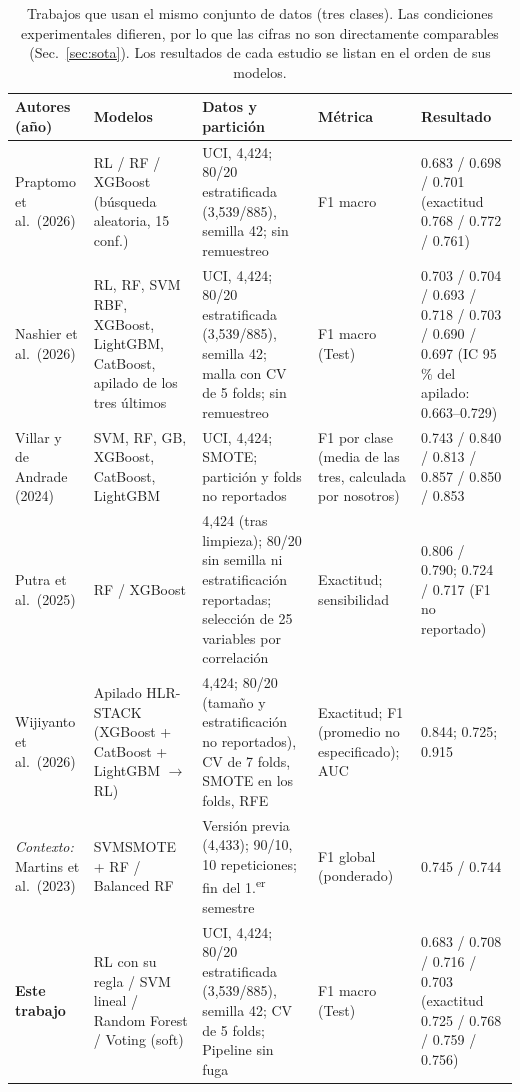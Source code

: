 \begin{table}[t]
\caption{Trabajos que usan el mismo conjunto de datos (tres clases). Las condiciones experimentales difieren, por lo que las cifras no son directamente comparables (Sec.~\ref{sec:sota}). Los resultados de cada estudio se listan en el orden de sus modelos.}
\label{tab:sota}
\centering\scriptsize
\setlength{\tabcolsep}{3pt}
\renewcommand{\arraystretch}{1.12}
\begin{tabular}{@{}p{2.55cm}p{3.1cm}p{4.3cm}p{2.2cm}p{4.3cm}@{}}
\toprule
Autores (año) & Modelos & Datos y partición & Métrica & Resultado \\
\midrule
Praptomo et al.\ (2026) \cite{praptomo2026} & RL / RF / XGBoost (búsqueda aleatoria, 15 conf.) & UCI, 4,424; 80/20 estratificada (3,539/885), semilla 42; sin remuestreo & F1 macro & 0.683 / 0.698 / 0.701 (exactitud 0.768 / 0.772 / 0.761) \\
\addlinespace[2pt]
Nashier et al.\ (2026) \cite{nashier2026} & RL, RF, SVM RBF, XGBoost, LightGBM, CatBoost, apilado de los tres últimos & UCI, 4,424; 80/20 estratificada (3,539/885), semilla 42; malla con CV de 5 folds; sin remuestreo & F1 macro (Test) & 0.703 / 0.704 / 0.693 / 0.718 / 0.703 / 0.690 / 0.697 (IC 95\,\% del apilado: 0.663--0.729) \\
\addlinespace[2pt]
Villar y de Andrade (2024) \cite{villar2024} & SVM, RF, GB, XGBoost, CatBoost, LightGBM & UCI, 4,424; SMOTE; partición y folds no reportados & F1 por clase (media de las tres, calculada por nosotros) & 0.743 / 0.840 / 0.813 / 0.857 / 0.850 / 0.853 \\
\addlinespace[2pt]
Putra et al.\ (2025) \cite{putra2025} & RF / XGBoost & 4,424 (tras limpieza); 80/20 sin semilla ni estratificación reportadas; selección de 25 variables por correlación & Exactitud; sensibilidad & 0.806 / 0.790; 0.724 / 0.717 (F1 no reportado) \\
\addlinespace[2pt]
Wijiyanto et al.\ (2026) \cite{wijiyanto2026} & Apilado HLR-STACK (XGBoost + CatBoost + LightGBM $\rightarrow$ RL) & 4,424; 80/20 (tamaño y estratificación no reportados), CV de 7 folds, SMOTE en los folds, RFE & Exactitud; F1 (promedio no especificado); AUC & 0.844; 0.725; 0.915 \\
\addlinespace[2pt]
\emph{Contexto:} Martins et al.\ (2023) \cite{martins2023} & SVMSMOTE + RF / Balanced RF & Versión previa (4,433); 90/10, 10 repeticiones; fin del 1.\textsuperscript{er} semestre & F1 global (ponderado) & 0.745 / 0.744 \\
\addlinespace[2pt]
\textbf{Este trabajo} & RL con su regla / SVM lineal / Random Forest / Voting (soft) & UCI, 4,424; 80/20 estratificada (3,539/885), semilla 42; CV de 5 folds; Pipeline sin fuga & F1 macro (Test) & 0.683 / 0.708 / 0.716 / 0.703 (exactitud 0.725 / 0.768 / 0.759 / 0.756) \\
\bottomrule
\end{tabular}
\end{table}
